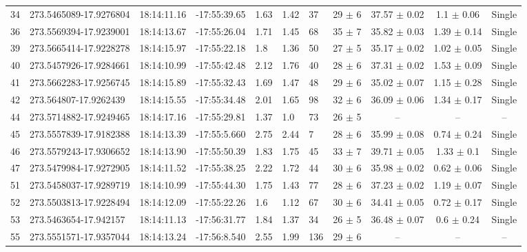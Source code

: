 \begin{table}[htbp!]
\begin{tabular}{llllllllccc}
34  &  273.5465089-17.9276804  &  18:14:11.16  &  -17:55:39.65  &  1.63  &  1.42  &  37  &  29 $\pm$ 6  &  37.57 $\pm$ 0.02  &  1.1 $\pm$ 0.06  &  Single \\
36  &  273.5569394-17.9239001  &  18:14:13.67  &  -17:55:26.04  &  1.71  &  1.45  &  68  &  35 $\pm$ 7  &  35.82 $\pm$ 0.03  &  1.39 $\pm$ 0.14  &  Single \\
39  &  273.5665414-17.9228278  &  18:14:15.97  &  -17:55:22.18  &  1.8  &  1.36  &  50  &  27 $\pm$ 5  &  35.17 $\pm$ 0.02  &  1.02 $\pm$ 0.05  &  Single \\
40  &  273.5457926-17.9284661  &  18:14:10.99  &  -17:55:42.48  &  2.12  &  1.76  &  40  &  28 $\pm$ 6  &  37.31 $\pm$ 0.02  &  1.53 $\pm$ 0.09  &  Single \\
41  &  273.5662283-17.9256745  &  18:14:15.89  &  -17:55:32.43  &  1.69  &  1.47  &  48  &  29 $\pm$ 6  &  35.02 $\pm$ 0.07  &  1.15 $\pm$ 0.28  &  Single \\
42  &  273.564807-17.9262439  &  18:14:15.55  &  -17:55:34.48  &  2.01  &  1.65  &  98  &  32 $\pm$ 6  &  36.09 $\pm$ 0.06  &  1.34 $\pm$ 0.17  &  Single \\
44  &  273.5714882-17.9249465  &  18:14:17.16  &  -17:55:29.81  &  1.37  &  1.0  &  73  &  26 $\pm$ 5  &  --  &  --  &  -- \\
45  &  273.5557839-17.9182388  &  18:14:13.39  &  -17:55:5.660  &  2.75  &  2.44  &  7  &  28 $\pm$ 6  &  35.99 $\pm$ 0.08  &  0.74 $\pm$ 0.24  &  Single \\
46  &  273.5579243-17.9306652  &  18:14:13.90  &  -17:55:50.39  &  1.83  &  1.75  &  45  &  33 $\pm$ 7  &  39.71 $\pm$ 0.05  &  1.33 $\pm$ 0.1  &  Single \\
47  &  273.5479984-17.9272905  &  18:14:11.52  &  -17:55:38.25  &  2.22  &  1.72  &  44  &  30 $\pm$ 6  &  35.98 $\pm$ 0.02  &  0.62 $\pm$ 0.06  &  Single \\
51  &  273.5458037-17.9289719  &  18:14:10.99  &  -17:55:44.30  &  1.75  &  1.43  &  77  &  28 $\pm$ 6  &  37.23 $\pm$ 0.02  &  1.19 $\pm$ 0.07  &  Single \\
52  &  273.5503813-17.9228494  &  18:14:12.09  &  -17:55:22.26  &  1.6  &  1.12  &  67  &  30 $\pm$ 6  &  34.41 $\pm$ 0.05  &  0.72 $\pm$ 0.17  &  Single \\
53  &  273.5463654-17.942157  &  18:14:11.13  &  -17:56:31.77  &  1.84  &  1.37  &  34  &  26 $\pm$ 5  &  36.48 $\pm$ 0.07  &  0.6 $\pm$ 0.24  &  Single \\
55  &  273.5551571-17.9357044  &  18:14:13.24  &  -17:56:8.540  &  2.55  &  1.99  &  136  &  29 $\pm$ 6  &  --  &  --  &  -- \\

\end{tabular}
\end{table}
